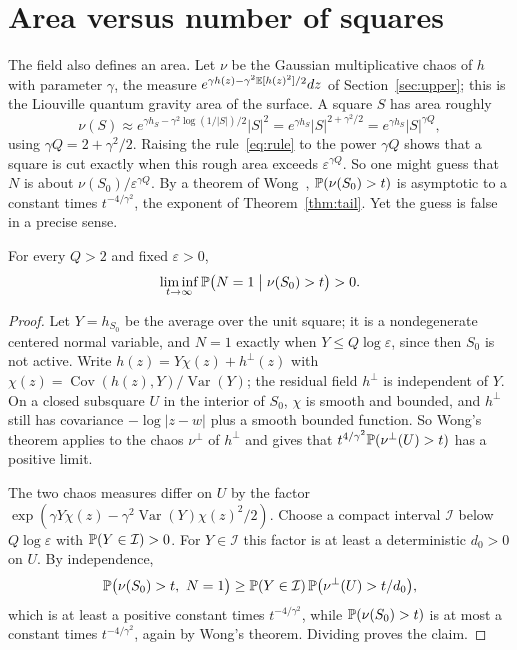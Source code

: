 \section{Area versus number of squares}\label{sec:area}

The field also defines an area. Let $\nu$ be the Gaussian multiplicative chaos of $h$ with
parameter $\gamma$, the measure $e^{\gamma h(z)-\gamma^2\mathbb{E}[h(z)^2]/2}dz$ of
Section~\ref{sec:upper}; this is the Liouville quantum gravity area of the surface. A
square $S$ has area roughly
\[
\nu(S)\approx e^{\gamma h_S-\gamma^2\log(1/|S|)/2}|S|^2=e^{\gamma h_S}|S|^{2+\gamma^2/2}
=e^{\gamma h_S}|S|^{\gamma Q},
\]
using $\gamma Q=2+\gamma^2/2$. Raising the rule~\eqref{eq:rule} to the power $\gamma Q$ shows that a
square is cut exactly when this rough area exceeds $\varepsilon^{\gamma Q}$. So one might guess that
$N$ is about $\nu(S_0)/\varepsilon^{\gamma Q}$. By a theorem of Wong~\cite{Wong}, $\mathbb{P}(\nu(S_0)>t)$
is asymptotic to a constant times $t^{-4/\gamma^2}$, the exponent of Theorem~\ref{thm:tail}. Yet
the guess is false in a precise sense.

\begin{proposition}\label{prop:area}
For every $Q>2$ and fixed $\varepsilon>0$,
\[
\liminf_{t\to\infty}\mathbb{P}\bigl(N=1\;\big|\;\nu(S_0)>t\bigr)>0 .
\]
\end{proposition}

\begin{proof}
Let $Y=h_{S_0}$ be the average over the unit square; it is a nondegenerate centered normal
variable, and $N=1$ exactly when $Y\le Q\log\varepsilon$, since then $S_0$ is not active. Write
$h(z)=Y\chi(z)+h^\perp(z)$ with $\chi(z)=\operatorname{Cov}(h(z),Y)/\operatorname{Var}(Y)$; the
residual field $h^\perp$ is independent of $Y$. On a closed subsquare $U$ in the interior of $S_0$,
$\chi$ is smooth and bounded, and $h^\perp$ still has covariance $-\log|z-w|$ plus a smooth
bounded function. So Wong's theorem applies to the chaos $\nu^\perp$ of $h^\perp$ and gives
that $t^{4/\gamma^2}\mathbb{P}(\nu^\perp(U)>t)$ has a positive limit.

The two chaos measures differ on $U$ by the factor $\exp(\gamma Y\chi(z)-\gamma^2\operatorname{Var}(Y)\chi(z)^2/2)$.
Choose a compact interval $\mathcal I$ below $Q\log\varepsilon$ with $\mathbb{P}(Y\in\mathcal I)>0$. For $Y\in\mathcal I$
this factor is at least a deterministic $d_0>0$ on $U$. By independence,
\[
\Prob\bigl(\nu(S_0)>t,\ N=1\bigr)\ge\Prob(Y\in\mathcal I)\,\Prob\bigl(\nu^\perp(U)>t/d_0\bigr),
\]
which is at least a positive constant times $t^{-4/\gamma^2}$, while $\mathbb{P}(\nu(S_0)>t)$ is at most a
constant times $t^{-4/\gamma^2}$, again by Wong's theorem. Dividing proves the claim.
\end{proof}

